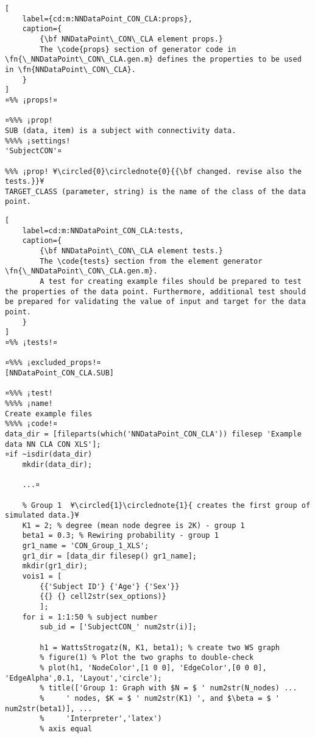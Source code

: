 \documentclass{tufte-handout}
\begin{document}
\begin{lstlisting}[
	label={cd:m:NNDataPoint_CON_CLA:props},
	caption={
		{\bf NNDataPoint\_CON\_CLA element props.}
		The \code{props} section of generator code in \fn{\_NNDataPoint\_CON\_CLA.gen.m} defines the properties to be used in \fn{NNDataPoint\_CON\_CLA}.
	}
]
¤%% ¡props!¤

¤%%% ¡prop!
SUB (data, item) is a subject with connectivity data.
%%%% ¡settings!
'SubjectCON'¤

%%% ¡prop! ¥\circled{0}\circlednote{0}{{\bf changed. revise also the tests.}}¥
TARGET_CLASS (parameter, string) is the name of the class of the data point.
\end{lstlisting}

\begin{lstlisting}[
	label=cd:m:NNDataPoint_CON_CLA:tests,
	caption={
		{\bf NNDataPoint\_CON\_CLA element tests.}
		The \code{tests} section from the element generator \fn{\_NNDataPoint\_CON\_CLA.gen.m}.
		A test for creating example files should be prepared to test the properties of the data point. Furthermore, additional test should be prepared for validating the value of input and target for the data point.
	}
]			
¤%% ¡tests!¤

¤%%% ¡excluded_props!¤
[NNDataPoint_CON_CLA.SUB]

¤%%% ¡test!
%%%% ¡name!
Create example files
%%%% ¡code!¤
data_dir = [fileparts(which('NNDataPoint_CON_CLA')) filesep 'Example data NN CLA CON XLS'];
¤if ~isdir(data_dir)
    mkdir(data_dir);

    ...¤

    % Group 1  ¥\circled{1}\circlednote{1}{ creates the first group of simulated data.}¥
    K1 = 2; % degree (mean node degree is 2K) - group 1
    beta1 = 0.3; % Rewiring probability - group 1
    gr1_name = 'CON_Group_1_XLS';
    gr1_dir = [data_dir filesep() gr1_name];
    mkdir(gr1_dir);
    vois1 = [
        {{'Subject ID'} {'Age'} {'Sex'}}
        {{} {} cell2str(sex_options)}
        ];
    for i = 1:1:50 % subject number
        sub_id = ['SubjectCON_' num2str(i)];

        h1 = WattsStrogatz(N, K1, beta1); % create two WS graph
        % figure(1) % Plot the two graphs to double-check
        % plot(h1, 'NodeColor',[1 0 0], 'EdgeColor',[0 0 0], 'EdgeAlpha',0.1, 'Layout','circle');
        % title(['Group 1: Graph with $N = $ ' num2str(N_nodes) ...
        %     ' nodes, $K = $ ' num2str(K1) ', and $\beta = $ ' num2str(beta1)], ...
        %     'Interpreter','latex')
        % axis equal


\end{lstlisting}
\end{document}
